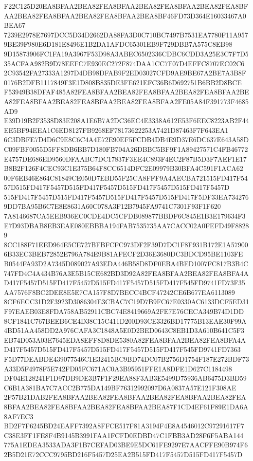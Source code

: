 \documentclass[UTF8,fontset=fandol,zihao=-4,a4paper]{ctexart}
\begin{document}
{{F22C125D20EA8BFAA2BEA82FEA8BFAA2BEA82FEA8BFAA2BEA82FEA8BFAA2BEA82FEA8BFAA2BEA82FEA8BFAA2BEA8BF46FD73D364E16033467A0BEA67
7239E2978E7697DCC5D34D2662DA88FA3D0C710BC7497B7531EA7780F11A9579BE39F980E6D181E8496E1B2DA1AFDC65301EB9F729DBB7A575C8EB98
9D15873906FC1FA19A3967F53D98A3ABEC6502336CDBC6CDD3A25E3C7F7D535ACFAA982B9D78EEFC7E930EC272F874DAA1CC7F07D4EFFC8707EC02C6
2C93542FA27333A1297D4DB98DFAB9F2ED03027CFD9AE9BE67A2BE7A3B8F0176B2DFB1117849F3E1D808B835DE3FE621EFC36B6D692751B6BB2D8BCE
F53949B38DFAF485A82FEA8BFAA2BEA82FEA8BFAA2BEA82FEA8BFAA2BEA82FEA8BFAA2BEA82FEA8BFAA2BEA82FEA8BFAA2FE05A84F391773F4685AD9
E39D19B2F3538D83E208A1E6B7A2DC36EC4E3338A612E53F6EEC8223AB2F44EE5BF94EEA1C6ED8127FB9268EF78173622253A7421D87463F7F643EA1
6C3DBFE7D4D6C9E8C6C4A4E72E90EF5FCDB4DB4E9D37E6DC637E643A58DC09FBF0055D5FF8DB6BB7D180FB704A26DBBC5BF9F1A89427571C4FB46772
E4757DE686ED9560DFAABC7DC17837F3EE4C893F4EC2F87B5D3F7AEF1E17B8B2F126F4CEC93C1E375B64F8CC6514DFC2E09979B30BFA4C591F1ACA62
00F6EB46E864C81849CE050D7EBD55F25CA8FFF9A4AECBA721515FD417F5457D515FD417F5457D515FD417F5457D515FD417F5457D515FD417F5457D
515FD417F5457D515FD417F5457D515FD417F5457D515FD417F5DF33EA7342769DD7BA95B6C7E8E8631A60C078A3F12B7945FA9741C7301F93F1F620
7A8146687CA5EEB936EC0CDE4DC5CFDB089877BBDF6C845E1B3E179634F3E7D93DBAB8EB3EAE080EBBBA194FAB7535735AA7CACC02A0FEFD49F88289
8CC188F71EED964E5CE727BFBFCFC973DF2F39D7DC1F8F931B172E1A579006B33EC3BEB72852E796A784E9B81AFECF2D36E3680DC3BDCD95BE1103FE
B0544FA93D2A7345D089027A93EDA446B58D8DF0EBA4BED1007FC817B3B4C747FD4C4A434B76A3E5B15CE682BD3D92A82FEA8BFAA2BEA82FEA8BFA4A
D417F5457D515FD417F5457D515FD417F5457D515FD417F545FD9741FD73F35AA7576F8BC2DEE8E5E7CA157F8D7BECC4BCF47242CE6B677EA6113089
8CF6ECC31D2F3923D3086304E3CBAC7C19D7B9FC67E0330AC6133DCF5ED31F97EAEB03E8FDA758AB52911CBC74E8419669A2FE7E76CECA349B74D1DD
8CF1841C767BEEB6CE4D38C15C411D200D93CE3326BD17775B13EAE30F99A4BD51AA458DD2A976CAFA3C1848A5E0D2BED0643C8EB1D3A610B641C5F3
EB74D053A03E7645EDA8EFF8D8DE5380A82FEA8BFAA2BEA82FEA8BFA4AD417F5457D515FD417F5457D515FD417F5457D515FD417F545FD9741FD7363
F5D77DEABDE439077546C1E32415BC9BD74DC07B2756D1754F187E272BDF73A33D5F4978F5E742FD05FC671AC0A3B95951FFE1A8DFE1D627C1184498
DF04E128241F1D97DB9DE3B7F1F29EA88F3AB3E5499D75936AB6475D3BD59C6B1A381BA7C7ACC2B775DA149BF76312992097D6A0837A57E121F308AE
2F57B21DAB2FEA8BFAA2BEA82FEA8BFAA2BEA82FEA8BFAA2BEA82FEA8BFAA2BEA82FEA8BFAA2BEA82FEA8BFAA2BEA87F1CD4EF61F89E1DA6A8AF7EC3
BD2F7F6245BD24EAFF7392A8FFCE517F81A3194F4E8A4546012C97291617F7C38E3FF1FE8F4B9145B3991FAA1FCFD0EDBD47C1FBB3AD28F6F5ABA144
775A1EDEA3533ADA3F1B7CEFAD03BE9E5DC61FE9297E7AACFFE90B974F62B5D21E72CCC9795BD216F5457D25EA2B515FD417F5457D515FD417F5457D
}}
\end{document}

